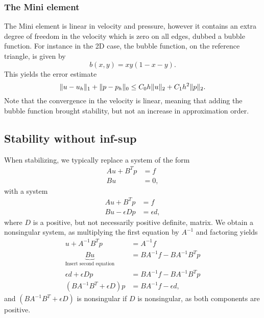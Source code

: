 \subsubsection{The Mini element}
The Mini element is linear in velocity and pressure, however it contains an extra degree of freedom in the velocity which is zero on all edges, dubbed a bubble function.
For instance in the 2D case, the bubble function, on the reference triangle, is given by
\begin{equation}
    b(x, y) = xy(1 - x - y).
\end{equation}
This yields the error estimate
\begin{equation}
    \lVert u - u_h\rVert_1 + \lVert p - p_h\rVert_0
    \leq
    C_0 h \lVert u\rVert_2 + C_1 h^2 \lVert p\rVert_2.
\end{equation}
Note that the convergence in the velocity is linear, meaning that adding the bubble function brought stability, but not an increase in approximation order.

\subsection{Stability without inf-sup}
When stabilizing, we typically replace a system of the form
\begin{equation}
    \begin{split}
        Au + B^T p &= f \\
        B u &= 0,
    \end{split}
\end{equation}
with a system
\begin{equation}
    \begin{split}
        Au + B^T p &= f \\
        B u - \epsilon Dp &= \epsilon d,
    \end{split}
\end{equation}
where $D$ is a positive, but not necessarily positive definite, matrix.
We obtain a nonsingular system, as multiplying the first equation by $A^{-1}$ and factoring yields
\begin{equation}
    \begin{split}
        u + A^{-1} B^T p &= A^{-1} f \\
        \underbrace{B u}_{\text{Insert second equation}} &= B A^{-1} f - B A^{-1} B^T p \\
        \epsilon d + \epsilon D p &= B A^{-1} f - B A^{-1} B^T p \\
        (B A^{-1} B^T + \epsilon D)p &= BA^{-1} f - \epsilon d,
    \end{split}
\end{equation}
and $(B A^{-1} B^T + \epsilon D)$ is nonsingular if $D$ is nonsingular, as both components are positive.

